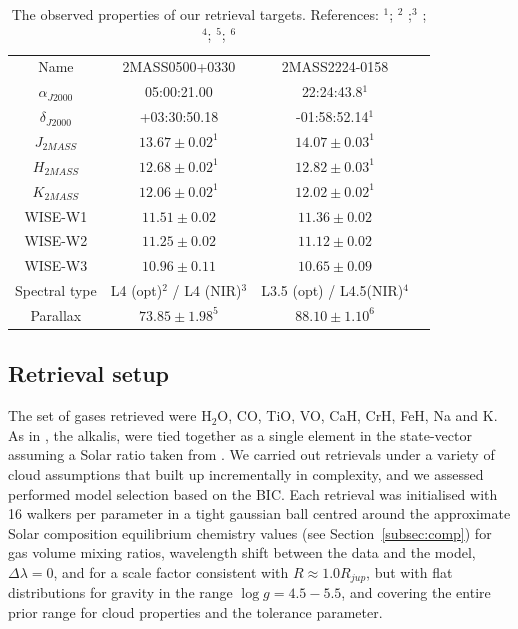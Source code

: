 \documentclass[useAMS,usenatbib]{mn2e}
\begin{document}
\begin{table}
\begin{tabular}{c c c c }
\hline
Name & 2MASS0500+0330 & 2MASS2224-0158\\
$\alpha_{J2000}$ & 05:00:21.00 & 22:24:43.8$^1$ \\
$\delta_{J2000}$ & +03:30:50.18 & -01:58:52.14$^1$ \\
$J_{2MASS}$& $13.67 \pm 0.02^1$ &  $14.07 \pm 0.03^1$ \\
$H_{2MASS}$ & $12.68 \pm 0.02^1$ &  $12.82 \pm 0.03^1$ \\
$K_{2MASS}$ & $12.06 \pm 0.02^1$ & $12.02 \pm 0.02^1$\\
WISE-W1 & $11.51 \pm 0.02$  & $11.36 \pm 0.02$ \\
WISE-W2 & $11.25 \pm 0.02$ & $11.12 \pm 0.02$ \\
WISE-W3 & $10.96 \pm0.11$ & $10.65 \pm 0.09$ \\
Spectral type & L4 (opt)$^2$  / L4 (NIR)$^3$ & L3.5 (opt) / L4.5(NIR)$^4$ \\
Parallax & $73.85 \pm 1.98^5$ & $88.10 \pm 1.10^6$ \\
\hline
\end{tabular}
\caption{The observed properties of our retrieval targets. References: $^1$\citet{2mass}; $^2$ \citet{reid2008};$^3$ \citet{gagliuffi2014}; $^4$\citet{stephens2009}; $^5$\citet{dieterich2014}; $^6$ \citet{faherty2009}
\label{tab:properties}
}
\end{table}


\subsection{Retrieval setup}
The set of gases retrieved were H$_{2}$O, CO, TiO, VO, CaH, CrH, FeH, Na and K. As in \citet{line2015}, the alkalis, were tied together as a single element in the state-vector assuming a Solar ratio taken from \citet{asplund2009}. We carried out retrievals under a variety of cloud assumptions that built up incrementally in complexity, and we assessed performed model selection based on the BIC.  Each retrieval was initialised with 16 walkers per parameter in a tight gaussian ball centred around the approximate Solar composition equilibrium chemistry values (see Section~\ref{subsec:comp}) for gas volume mixing ratios, wavelength shift between the data and the model,$\Delta \lambda = 0$, and for a scale factor consistent with $R \approx1.0 R_{jup}$,  but with flat distributions for gravity in the range $\log g = 4.5 - 5.5$, and covering the entire prior range for cloud properties and the tolerance parameter. 
\end{document}
